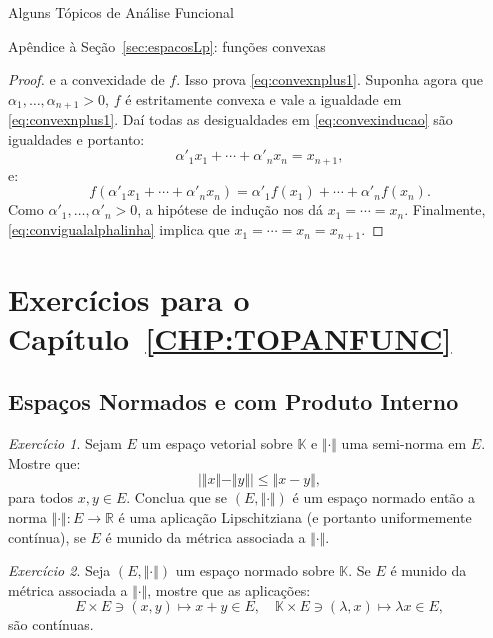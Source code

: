 \documentclass[oneside,final,11pt]{amsbook}
\newcommand{\R}{\mathds R}
\newcommand{\K}{\mathds K}
\theoremstyle{remark}\newtheorem{exercise}{Exercício}[chapter]
\theoremstyle{remark}\newtheorem{*exercise}[exercise]{\hbox to 0pt{\hskip 0pt minus 1fil*}Exercício}
\theoremstyle{definition}\newtheorem{exdefin}{Definição}[chapter]
\theoremstyle{plain}\newtheorem{teo}{Teorema}[section]
\theoremstyle{plain}\newtheorem{lem}[teo]{Lema}
\theoremstyle{plain}\newtheorem{prop}[teo]{Proposição}
\theoremstyle{plain}\newtheorem{cor}[teo]{Corolário}
\theoremstyle{definition}\newtheorem{defin}[teo]{Definição}
\theoremstyle{remark}\newtheorem{rem}[teo]{Observação}
\theoremstyle{definition}\newtheorem{notation}[teo]{Notação}
\theoremstyle{definition}\newtheorem{convention}[teo]{Convenção}
\theoremstyle{definition}\newtheorem{example}[teo]{Exemplo}
\numberwithin{section}{chapter}
\numberwithin{equation}{section}
\begin{document}
\begin{chapter}{Alguns Tópicos de Análise Funcional}
\begin{section}{Apêndice à Seção~\ref{sec:espacosLp}: funções convexas}
\begin{proof}
e a convexidade de $f$. Isso prova \eqref{eq:convexnplus1}.
Suponha agora que $\alpha_1,\ldots,\alpha_{n+1}>0$,
$f$ é estritamente convexa e vale a igualdade em \eqref{eq:convexnplus1}. Daí
todas as desigualdades em \eqref{eq:convexinducao} são igualdades e portanto:
\begin{equation}\label{eq:convigualalphalinha}
\alpha'_1x_1+\cdots+\alpha'_nx_n=x_{n+1},
\end{equation}
e:
\[f(\alpha'_1x_1+\cdots+\alpha'_nx_n)=\alpha'_1f(x_1)+\cdots+\alpha'_nf(x_n).\]
Como $\alpha'_1,\ldots,\alpha'_n>0$, a hipótese de indução nos dá $x_1=\cdots=x_n$.
Finalmente, \eqref{eq:convigualalphalinha} implica que $x_1=\cdots=x_n=x_{n+1}$.
\end{proof}

\end{section}

\section*{Exercícios para o Capítulo~\ref{CHP:TOPANFUNC}}

\subsection*{Espaços Normados e com Produto Interno}

\begin{exercise}\label{exe:outratriangular}
Sejam $E$ um espaço vetorial sobre $\K$ e $\Vert\cdot\Vert$ uma semi-norma em $E$. Mostre que:
\[\big\vert\Vert x\Vert-\Vert y\Vert\big\vert\le\Vert x-y\Vert,\]
para todos $x,y\in E$. Conclua que se $(E,\Vert\cdot\Vert)$ é um espaço normado
então a norma $\Vert\cdot\Vert:E\to\R$ é uma aplicação Lipschitziana
(e portanto uniformemente contínua), se $E$ é munido da métrica associada a $\Vert\cdot\Vert$.
\end{exercise}

\begin{exercise}\label{exe:operacoescontinuas}
Seja $(E,\Vert\cdot\Vert)$ um espaço normado sobre $\K$. Se $E$ é munido da métrica associada a $\Vert\cdot\Vert$,
mostre que as aplicações:
\[E\times E\ni(x,y)\longmapsto x+y\in E,\quad\K\times E\ni(\lambda,x)\longmapsto\lambda x\in E,\]
são contínuas.
\end{exercise}


\end{chapter}
\end{document}
